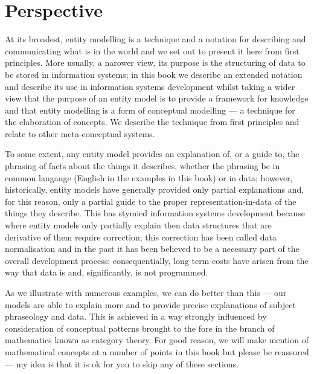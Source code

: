 \section{Perspective}
\label{Perspective}
At its broadest, entity modelling is a technique and a notation for describing and communicating what is in the world and we set out to present it here from first principles. More usually, a narower view, its purpose is the structuring of data to be stored in information systems; in this book we describe an extended notation and describe its use in information systems development
whilst taking a
 wider view that the purpose of an entity model is to provide a framework for knowledge and that entity modelling is a form of conceptual modelling --- a technique for the elaboration of concepts. We describe the technique from first principles and relate to other meta-conceptual systems. 

To some extent, any entity model provides an explanation of, or a guide to, 
the phrasing of facts about the things it describes, whether the phrasing be in common langauge
(English in the examples in this book) or in data;
however, historically, entity models have generally 
provided only  partial explanations and, for this reason, 
only a partial guide to the proper representation-in-data of the things they describe.
This has stymied information systems development because where entity models only partially
explain then data structures that are derivative of them require correction; 
this correction has been called data normalisation and 
in the past it has been believed to be a necessary part of the overall development process; consequentially, long term costs  have arisen from the way that data is and, significantly, is not programmed.

As we illustrate with numerous examples, we can do better than this ---
our models are able to explain more and to provide 
precise explanations of subject phraseology and data. 
This is achieved in a way strongly influenced by consideration of conceptual patterns
brought to the fore in the branch of mathematics known as category theory. 
For good reason, we will make mention of mathematical concepts at a number of points in this book
but please be reassured --- my idea is that it is ok for you to skip any of these sections. 

